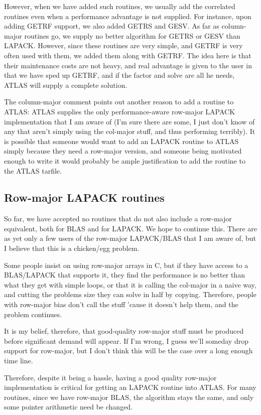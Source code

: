 \documentclass[11pt]{article}
\begin{document}
However, when we have added such routines, we usually add the correlated
routines even when a performance advantage is not supplied.  For instance,
upon adding GETRF support, we also added GETRS and GESV.  As far as column-
major routines go, we supply no better algorithm for GETRS or GESV than
LAPACK.  However, since these routines are very simple, and GETRF is very
often used with them, we added them along with GETRF.  The idea here is that
their maintenance costs are not heavy, and real advantage is given to the
user in that we have sped up GETRF, and if the factor and solve are all
he needs, ATLAS will supply a complete solution.

The column-major comment points out another reason to add a routine to
ATLAS: ATLAS supplies the only performance-aware row-major LAPACK
implementation that I am aware of (I'm sure there are some, I just don't
know of any that aren't simply using the col-major stuff, and thus
performing terribly).  It is possible that someone would want to add an
LAPACK routine to ATLAS simply because they need a row-major version, and
someone being motivated enough to write it would probably be ample
justification to add the routine to the ATLAS tarfile.

\subsection{Row-major LAPACK routines}

So far, we have accepted no routines that do not also include a row-major
equivalent, both for BLAS and for LAPACK.  We hope to continue this.  There
are as yet only a few users of the row-major LAPACK/BLAS that I am aware of,
but I believe that this is a chicken/egg problem.

Some people insist on using row-major arrays in C, but if they have access
to a BLAS/LAPACK that supports it, they find the performance is no better
than what they get with simple loops, or that it is calling the col-major
in a naive way, and cutting the problems size they can solve in half by
copying.  Therefore, people with row-major bias don't call the stuff 'cause
it doesn't help them, and the problem continues.

It is my belief, therefore, that good-quality row-major stuff must be
produced before significant demand will appear.  If I'm wrong, I guess
we'll someday drop support for row-major, but I don't think this will be
the case over a long enough time line.

Therefore, despite it being a hassle, having a good quality row-major
implementation is critical for getting an LAPACK routine into ATLAS.
For many routines, since we have row-major BLAS, the algorithm stays
the same, and only some pointer arithmetic need be changed.
\end{document}
